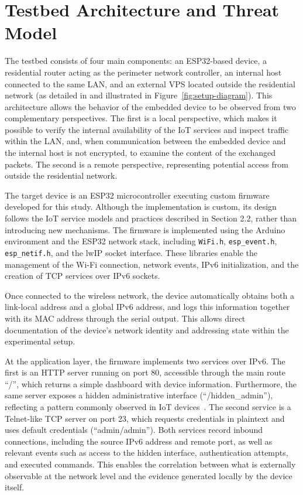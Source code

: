 \section{Testbed Architecture and Threat Model}\label{sec:testbed-threat-model} 
The testbed consists of four main components: an ESP32-based device, a residential router acting as the perimeter network controller, an internal host connected to the same LAN, and an external VPS located outside the residential network (as detailed in  and illustrated in Figure~\ref{fig:setup-diagram}). This architecture allows the behavior of the embedded device to be observed from two complementary perspectives. The first is a local perspective, which makes it possible to verify the internal availability of the IoT services and inspect traffic within the LAN, and, when communication between the embedded device and the internal host is not encrypted, to examine the content of the exchanged packets. The second is a remote perspective, representing potential access from outside the residential network.


The target device is an ESP32 microcontroller executing custom firmware developed for this study. Although the implementation is custom, its design follows the IoT service models and practices described in Section 2.2, rather than introducing new mechanisms. The firmware is implemented using the Arduino environment and the ESP32 network stack, including \verb|WiFi.h|, \verb|esp_event.h|, \verb|esp_netif.h|, and the lwIP socket interface. These libraries enable the management of the Wi-Fi connection, network events, IPv6 initialization, and the creation of TCP services over IPv6 sockets.

Once connected to the wireless network, the device automatically obtains both a link-local address and a global IPv6 address, and logs this information together with its MAC address through the serial output. This allows direct documentation of the device’s network identity and addressing state within the experimental setup.

At the application layer, the firmware implements two services over IPv6. The first is an HTTP server running on port 80, accessible through the main route ``/'', which returns a simple dashboard with device information. Furthermore, the same server exposes a hidden administrative interface (``/hidden\_admin''), reflecting a pattern commonly observed in IoT devices~\cite{liu2025eagleye}. The second service is a Telnet-like TCP server on port 23, which requests credentials in plaintext and uses default credentials (``admin/admin''). Both services record inbound connections, including the source IPv6 address and remote port, as well as relevant events such as access to the hidden interface, authentication attempts, and executed commands. This enables the correlation between what is externally observable at the network level and the evidence generated locally by the device itself.

